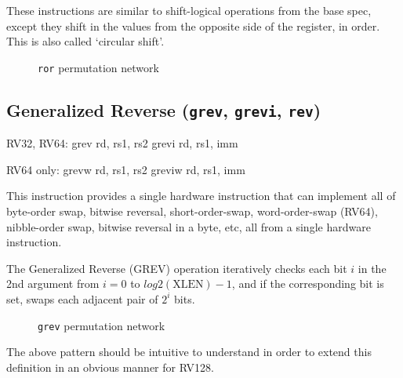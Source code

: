 These instructions are similar to shift-logical operations from the base
spec, except they shift in the values from the opposite side of the
register, in order. This is also called `circular shift'.




\begin{figure}[t]
\begin{center}

\end{center}
\caption{\texttt{ror} permutation network}
\label{permnet-ror}
\end{figure}

\subsection{Generalized Reverse (\texttt{grev}, \texttt{grevi}, \texttt{rev})}
\label{grev}

\begin{rvb}
  RV32, RV64:
    grev  rd, rs1, rs2
    grevi rd, rs1, imm

  RV64 only:
    grevw  rd, rs1, rs2
    greviw rd, rs1, imm
\end{rvb}

This instruction provides a single hardware instruction that can implement all
of byte-order swap, bitwise reversal, short-order-swap, word-order-swap
(RV64), nibble-order swap, bitwise reversal in a byte, etc, all from a single
hardware instruction.

The Generalized Reverse (GREV) operation iteratively checks each bit $i$ in the
2nd argument from $i=0$ to $log2(\textrm{XLEN})-1$, and if the corresponding bit is
set, swaps each adjacent pair of $2^i$ bits.

\begin{figure}[t]
\begin{center}

\end{center}
\caption{\texttt{grev} permutation network}
\label{permnet-grev}
\end{figure}



The above pattern should be intuitive to understand in order to extend
this definition in an obvious manner for RV128.

